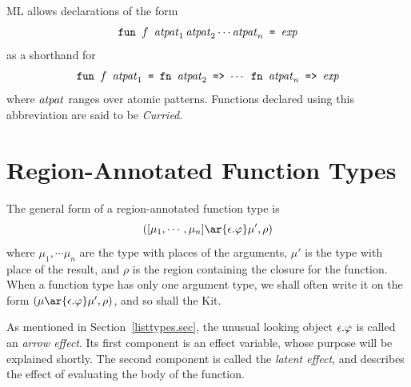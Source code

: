 \documentclass[12pt]{book}
\begin{document}
ML allows declarations of the form
%
$$\hbox{\tt fun $f$ ${\it atpat}_1\,{\it atpat}_2 \cdots {\it atpat}_n$ = $\hbox{\it exp}$}$$
as a shorthand for 
$$\hbox{\tt fun $f$ ${\it atpat}_1$ = fn ${\it atpat}_2$ => $\cdots$ fn ${\it atpat}_n$
  => $\hbox{\it exp}$}$$
where ${\it atpat}$ ranges over atomic patterns.  Functions
declared using this abbreviation are said to be
%
{\em Curried}.

\section{Region-Annotated Function Types}
\label{functiontypes.sec}
The general form of a region-annotated 
%
%
function type is
$$([\mu_1,\cdots,\mu_n] \ar{\epsilon.\rea} \mu', \rho)$$
where
$\mu_1,\cdots\mu_n$ are the type with places of the arguments, $\mu'$
is the type with place of the result, and $\rho$ is the region
containing the closure for the function. When a function type has only
one argument type, we shall often write it on the form $(\mu
\ar{\epsilon.\rea} \mu', \rho)$, and so shall the Kit.

As mentioned in Section~\ref{listtypes.sec}, the unusual looking
object $\epsilon.\varphi$ is called an
%
{\em arrow effect}. Its first component
is an 
%
effect variable, whose purpose will be explained shortly.  The second
component is called the
%
{\em latent effect}, and describes the effect of evaluating the body
of the function.
\end{document}
